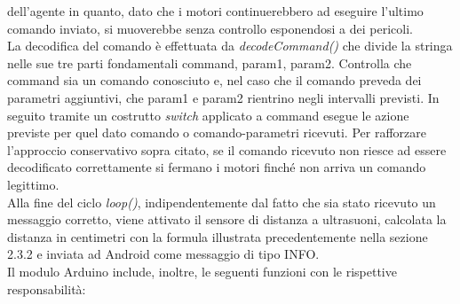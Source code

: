 dell'agente in quanto, dato che i motori continuerebbero ad eseguire l'ultimo 
comando inviato, si muoverebbe senza controllo esponendosi a dei pericoli.\\
La decodifica del comando è effettuata da \emph{decodeCommand()} che divide la stringa 
nelle sue tre parti fondamentali command, param1, param2. Controlla che command
sia un comando conosciuto e, nel caso che il comando preveda dei parametri aggiuntivi,
che param1 e param2 rientrino negli intervalli previsti. In seguito tramite un costrutto 
\emph{switch} applicato a command esegue le azione previste per quel dato comando o comando-parametri
ricevuti. Per rafforzare l'approccio conservativo sopra citato, se il comando 
ricevuto non riesce ad essere decodificato correttamente 
si fermano i motori finché non arriva un comando legittimo.\\
Alla fine del ciclo \emph{loop()}, indipendentemente dal fatto che sia stato ricevuto un messaggio corretto,
viene attivato il sensore di distanza a ultrasuoni, calcolata la distanza in centimetri
con la formula illustrata precedentemente nella sezione 2.3.2 e inviata ad Android
come messaggio di tipo INFO.\\
Il modulo Arduino include, inoltre, le seguenti funzioni con le rispettive responsabilità:
